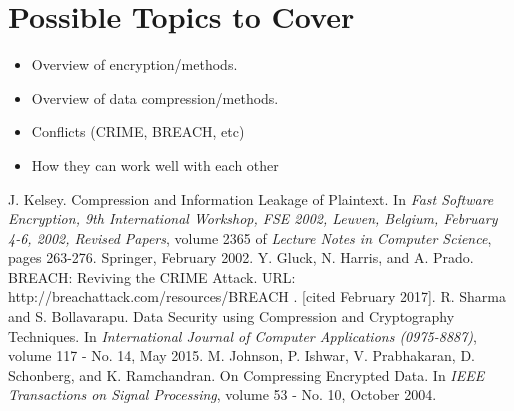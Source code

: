 \documentclass[11pt]{article}
\begin{document}
\section{Possible Topics to Cover}\label{topics}

\begin{itemize}
	\item[]Overview of encryption/methods.
	\item[]Overview of data compression/methods.
	\item[]Conflicts (CRIME, BREACH, etc)
	\item[]How they can work well with each other
\end{itemize}



\begin{thebibliography}{10}
J. Kelsey.
Compression and Information Leakage of Plaintext.
In \textit{Fast Software Encryption, 9th International Workshop, FSE 2002, Leuven, Belgium, February 4-6, 2002, Revised Papers}, 
volume 2365 of \textit{Lecture Notes in Computer Science}, pages 263-276. Springer, February 2002.
Y. Gluck, N. Harris, and A. Prado. 
BREACH: Reviving the CRIME Attack. 
URL: http://breachattack.com/resources/BREACH%
. [cited February 2017].
R. Sharma and S. Bollavarapu. 
Data Security using Compression and Cryptography Techniques. 
In \textit{International Journal of Computer Applications (0975-8887)}, volume 117 - No. 14, May 2015. 
M. Johnson, P. Ishwar, V. Prabhakaran, D. Schonberg, and K. Ramchandran. 
On Compressing Encrypted Data. 
In \textit{IEEE Transactions on Signal Processing}, volume 53 - No. 10, October 2004. 
\end{thebibliography}
\end{document}

